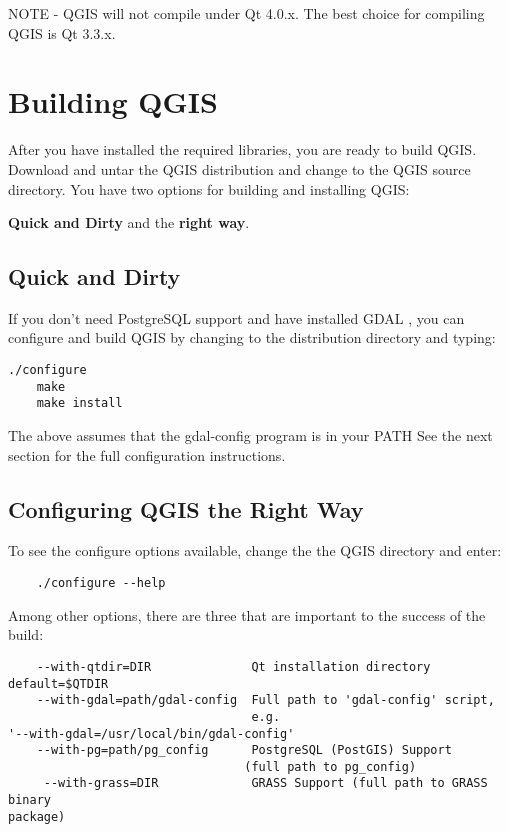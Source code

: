 NOTE - QGIS will not compile under Qt 4.0.x. The best choice for compiling
QGIS is Qt 3.3.x.

\section{Building QGIS}
  
After you have installed the required libraries, you are ready to build
QGIS. Download and untar the QGIS distribution and change to the QGIS
source directory. You have two options for building and installing QGIS:

\textbf{Quick and Dirty} and the \textbf{right way}.
  
\subsection{Quick and Dirty}
  
If you don't need PostgreSQL support and have installed GDAL ,
you can configure and build QGIS by changing to the distribution
directory and typing:
  
  \begin{verbatim}./configure
    make
    make install
  \end{verbatim}
  
The above assumes that the gdal-config program is in your PATH
See the next section for the full configuration instructions.
  
\subsection{Configuring QGIS the Right Way}
  
To see the configure options available, change the the QGIS directory and
enter:

  \begin{verbatim}
    ./configure --help
   \end{verbatim}
  
Among other options, there are three that are important to the success of
the build:

  \begin{verbatim}
    --with-qtdir=DIR              Qt installation directory default=$QTDIR
    --with-gdal=path/gdal-config  Full path to 'gdal-config' script,
                                  e.g.
'--with-gdal=/usr/local/bin/gdal-config'
    --with-pg=path/pg_config      PostgreSQL (PostGIS) Support
                                 (full path to pg_config)
     --with-grass=DIR             GRASS Support (full path to GRASS binary
package)

  \end{verbatim}

